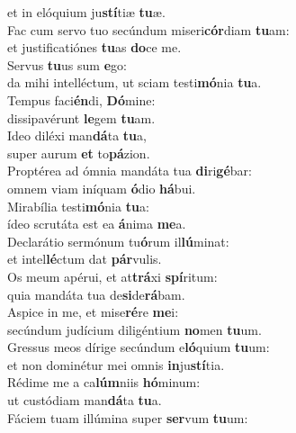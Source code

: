 \oddverse et in elóquium ju\textbf{stí}tiæ \textbf{tu}æ.\\
\evenverse Fac cum servo tuo secúndum miseri\textbf{cór}diam \textbf{tu}am:~\*\\
\evenverse et justificatiónes \textbf{tu}as \textbf{do}ce me.\\
\oddverse Servus \textbf{tu}us sum \textbf{e}go:~\*\\
\oddverse da mihi intelléctum, ut sciam testi\textbf{mó}nia \textbf{tu}a.\\
\evenverse Tempus faci\textbf{én}di, \textbf{Dó}mine:~\*\\
\evenverse dissipavérunt \textbf{le}gem \textbf{tu}am.\\
\oddverse Ideo diléxi man\textbf{dá}ta \textbf{tu}a,~\*\\
\oddverse super aurum \textbf{et} to\textbf{pá}zion.\\
\evenverse Proptérea ad ómnia mandáta tua \textbf{di}ri\textbf{gé}bar:~\*\\
\evenverse omnem viam iníquam \textbf{ó}dio \textbf{há}bui.\\
\oddverse Mirabília testi\textbf{mó}nia \textbf{tu}a:~\*\\
\oddverse ídeo scrutáta est ea \textbf{á}nima \textbf{me}a.\\
\evenverse Declarátio sermónum tu\textbf{ó}rum il\textbf{lú}minat:~\*\\
\evenverse et intel\textbf{lé}ctum dat \textbf{pár}vulis.\\
\oddverse Os meum apérui, et at\textbf{trá}xi \textbf{spí}ritum:~\*\\
\oddverse quia mandáta tua de\textbf{si}de\textbf{rá}bam.\\
\evenverse Aspice in me, et mise\textbf{ré}re \textbf{me}i:~\*\\
\evenverse secúndum judícium diligéntium \textbf{no}men \textbf{tu}um.\\
\oddverse Gressus meos dírige secúndum e\textbf{ló}quium \textbf{tu}um:~\*\\
\oddverse et non dominétur mei omnis \textbf{in}ju\textbf{stí}tia.\\
\evenverse Rédime me a ca\textbf{lúm}niis \textbf{hó}minum:~\*\\
\evenverse ut custódiam man\textbf{dá}ta \textbf{tu}a.\\
\oddverse Fáciem tuam illúmina super \textbf{ser}vum \textbf{tu}um:~\*\\
